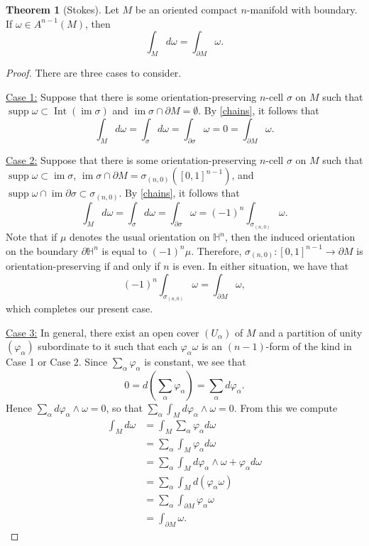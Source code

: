 \documentclass[10pt,letterpaper,cm]{nupset}
\theoremstyle{definition}
\theoremstyle{theorem}
\newtheorem{theorem}[definition]{Theorem}
\theoremstyle{remark}
\renewcommand{\H}{\mathbb H}
\newcommand{\1}{\mathbf{1}}
\newcommand{\0}{\vec 0}
\DeclareMathOperator{\im}{im}
\DeclareMathOperator{\Int}{Int}
\DeclareMathOperator{\supp}{supp}
\begin{document}
\begin{theorem}[Stokes]\label{stokes}
Let $M$ be an oriented compact $n$-manifold with boundary. If $\omega \in A^{n-1}(M)$, then $$ \int_M d\omega = \int_{\partial{M}} \omega  .$$
\end{theorem}
\begin{proof} There are three cases to consider.

\medskip


\underline{Case 1:} Suppose that there is some orientation-preserving $n$-cell $\sigma$ on $M$ such that $\supp \omega \subset \Int(\im \sigma)$ and $\im \sigma \cap \partial{M} =\emptyset$. By \cref{chains}, it follows that $$\int_M d\omega  = \int_{\sigma} d\omega = \int_{\partial{\sigma}} \omega = 0 = \int_{\partial{M}} \omega    .$$

\medskip


\underline{Case 2:} Suppose that there is some orientation-preserving $n$-cell $\sigma$ on $M$ such that $\supp \omega \subset  \im \sigma$, $\im \sigma \cap \partial{M} =\sigma_{(n,0)}\left(\left[0,1\right]^{n-1}\right)$, and $\supp \omega \cap \im \partial{\sigma} \subset \sigma_{(n,0)}$. By \cref{chains}, it follows that $$\int_M d\omega  = \int_{\sigma} d\omega = \int_{\partial{\sigma}} \omega = ({-1})^n \int_{\sigma_{(n,0)}} \omega .$$ Note that if $\mu$ denotes the usual orientation on $\H^n$, then the induced orientation on the boundary $\partial{\H^n}$ is equal to $({-1})^n \mu$. Therefore, $\sigma_{(n,0)} : \left[0,1\right]^{n-1}\to \partial{M}$ is orientation-preserving  if and only if $n$ is even. In either situation, we have that $$({-1})^n \int_{\sigma_{(n,0)}} \omega = \int_{\partial{M}} \omega  ,$$ which completes our present case.

\medskip


\underline{Case 3:} In general, there exist an open cover $(U_{\alpha})$ of $M$ and a partition of unity $(\varphi_{\alpha})$ subordinate to it such that each $\varphi_{\alpha}\omega$ is an $(n-1)$-form of the kind in Case 1 or Case 2. Since $\sum_{\alpha} \varphi_{\alpha}$ is constant, we see that $$0 = d\left(\sum_{\alpha} \varphi_{\alpha} \right) = \sum_{\alpha} d \varphi_{\alpha}.$$ Hence $ \sum_{\alpha} d \varphi_{\alpha} \wedge \omega =0$, so that $\sum_{\alpha} \int_M d\varphi_{\alpha} \wedge \omega =0$. From this we compute
\begin{align*}
 \int_M d\omega & = \int_M \sum_{\alpha} \varphi_{\alpha} d\omega 
 \\ & = \sum_{\alpha}\int_M \varphi_{\alpha} d\omega
\\ & =  \sum_{\alpha}\int_M d\varphi_{\alpha} \wedge \omega + \varphi_{\alpha} d\omega 
\\ & =  \sum_{\alpha}\int_M d(\varphi_{\alpha} \omega)
\\ & = \sum_{\alpha} \int_{\partial{M}} \varphi_{\alpha} \omega 
\\ & =  \int_{\partial{M}} \omega .
\end{align*}
\end{proof}
\end{document}
